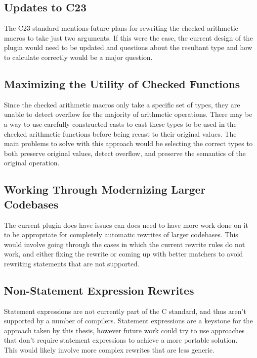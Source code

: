 \subsection{Updates to C23}

The C23 standard mentions future plans for rewriting the checked arithmetic macros to take just two arguments. If this were the case, the current design of the plugin would need to be updated and questions about the resultant type and how to calculate correctly would be a major question.

\subsection{Maximizing the Utility of Checked Functions}

Since the checked arithmetic macros only take a specific set of types, they are unable to detect overflow for the majority of arithmetic operations. There may be a way to use carefully constructed casts to cast these types to be used in the checked arithmetic functions before being recast to their original values. The main problems to solve with this approach would be selecting the correct types to both preserve original values, detect overflow, and preserve the semantics of the original operation.

\subsection{Working Through Modernizing Larger Codebases}

The current plugin does have issues can does need to have more work done on it to be appropriate for completely automatic rewrites of larger codebases. This would involve going through the cases in which the current rewrite rules do not work, and either fixing the rewrite or coming up with better matchers to avoid rewriting statements that are not supported.

\subsection{Non-Statement Expression Rewrites}

Statement expressions are not currently part of the C standard, and thus aren't supported by a number of compilers. Statement expressions are a keystone for the approach taken by this thesis, however future work could try to use approaches that don't require statement expressions to achieve a more portable solution. This would likely involve more complex rewrites that are less generic.

